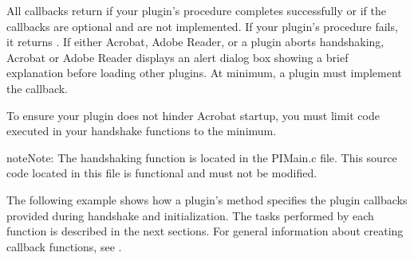 \documentclass[letterpaper,12pt,english,openany,oneside]{sphinxmanual}
\begin{document}
All callbacks return  if your plugin’s procedure completes successfully or if the callbacks are optional and are not implemented. If your plugin’s procedure fails, it returns . If either Acrobat, Adobe Reader, or a plug\sphinxhyphen{}in aborts handshaking, Acrobat or Adobe Reader displays an alert dialog box showing a brief explanation before loading other plugins. At minimum, a plugin must implement the  callback.

To ensure your plugin does not hinder Acrobat startup, you must limit code executed in your handshake functions to the minimum.

\begin{sphinxadmonition}{note}{Note:}
The handshaking function is located in the PIMain.c file. This source code located in this file is functional and must not be modified.
\end{sphinxadmonition}

The following example shows how a plugin’s  method specifies the plugin callbacks provided during handshake and initialization. The tasks performed by each function is described in the next sections. For general information about creating callback functions, see .
\end{document}
